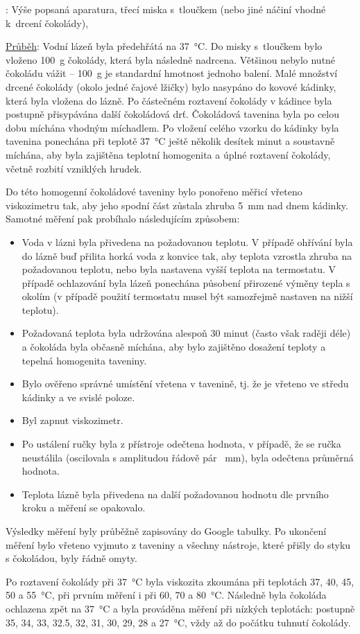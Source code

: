 \documentclass[12pt]{article}
\begin{document}
\underline{}: Výše popsaná aparatura, třecí miska s~tloučkem (nebo jiné náčiní vhodné k~drcení čokolády), 
\par \underline{Průběh}: Vodní lázeň byla předehřátá na \SI{37}{\degreeCelsius}. Do misky s~tloučkem bylo vloženo \SI{100}{\gram} čokolády, která byla následně nadrcena. Většinou nebylo nutné čokoládu vážit -- \SI{100}{\gram} je standardní hmotnost jednoho balení. Malé množství drcené čokolády (okolo jedné čajové lžičky) bylo nasypáno do kovové kádinky, která byla vložena do lázně. Po částečném roztavení čokolády v kádince byla postupně přisypávána další čokoládová drť. Čokoládová tavenina byla po celou dobu míchána vhodným míchadlem. Po vložení celého vzorku do kádinky byla tavenina ponechána při teplotě \SI{37}{\degreeCelsius} ještě několik desítek minut a soustavně míchána, aby byla zajištěna teplotní homogenita a úplné roztavení čokolády, včetně rozbití vzniklých hrudek.
\par
Do této homogenní čokoládové taveniny bylo ponořeno měřicí vřeteno viskozimetru tak, aby jeho spodní část zůstala zhruba \SI{5}{\milli\metre} nad dnem kádinky. Samotné měření pak probíhalo následujícím způsobem:
\begin{itemize}[noitemsep, topsep = 0pt]
    \item Voda v lázni byla přivedena na požadovanou teplotu. V případě ohřívání byla do lázně buď přilita horká voda z konvice tak, aby teplota vzrostla zhruba na požadovanou teplotu, nebo byla nastavena vyšší teplota na termostatu. V případě ochlazování byla lázeň ponechána působení přirozené výměny tepla s okolím (v případě použití termostatu musel být samozřejmě nastaven na nižší teplotu).
    \item Požadovaná teplota byla udržována alespoň 30 minut (často však raději déle) a čokoláda byla občasně míchána, aby bylo zajištěno dosažení teploty a tepelná homogenita taveniny.
    \item Bylo ověřeno správné umístění vřetena v tavenině, tj. že je vřeteno ve středu kádinky a ve svislé poloze.
    \item Byl zapnut viskozimetr.
    \item Po ustálení ručky byla z přístroje odečtena hodnota, v případě, že se ručka neustálila (oscilovala s amplitudou řádově pár \SI{}{\milli\metre}), byla odečtena průměrná hodnota.
    \item Teplota lázně byla přivedena na další požadovanou hodnotu dle prvního kroku a měření se opakovalo.
\end{itemize}
Výsledky měření byly průběžně zapisovány do Google tabulky. Po ukončení měření bylo vřeteno vyjmuto z taveniny a všechny nástroje, které přišly do styku s čokoládou, byly řádně omyty.
\par
Po roztavení čokolády při \SI{37}{\degreeCelsius} byla viskozita zkoumána při teplotách \SI{37}{}, \SI{40}{}, \SI{45}{}, \SI{50}{} a \SI{55}{\degreeCelsius}, při prvním měření i při \SI{60}{}, \SI{70}{} a \SI{80}{\degreeCelsius}. Následně byla čokoláda ochlazena zpět na \SI{37}{\degreeCelsius} a byla prováděna měření při nízkých teplotách: postupně \SI{35}{}, \SI{34}{}, \SI{33}{}, \SI{32,5}{}, \SI{32}{}, \SI{31}{}, \SI{30}{}, \SI{29}{}, \SI{28}{} a \SI{27}{\degreeCelsius}, vždy až do počátku tuhnutí čokolády.
\end{document}
